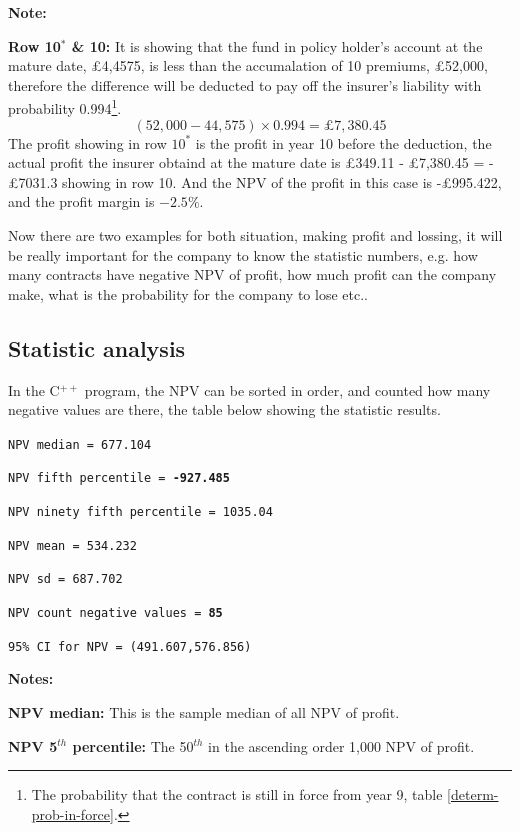 \documentclass{report}
\begin{document}
\textbf{Note:}


\textbf{Row 10$^*$ \& 10:} It is showing that the fund in policy holder's account at the mature date, \pounds 4,4575, is less than the accumalation of 10 premiums, \pounds 52,000, therefore the difference will be deducted to pay off the insurer's liability with probability 0.994\footnote{The probability that the contract is still in force from year 9, table \ref{determ-prob-in-force}.}. 
\[
(52,000- 44,575)\times 0.994= \pounds 7,380.45 
\]
The profit showing in row $10^*$ is the profit in year 10 before the deduction, the actual profit the insurer obtaind at the mature date is \pounds349.11 - \pounds7,380.45 = -\pounds 7031.3 showing in row 10. And the NPV of the profit in this case is -\pounds995.422, and the profit margin is $-2.5\%$.



Now there are two examples for both situation, making profit and lossing, it will be really important for the company to know the statistic numbers, e.g. how many contracts have negative NPV of profit, how much profit can the company make, what is the probability for the company to lose etc..

\subsection{Statistic analysis}

In the C$^{++}$ program, the NPV can be sorted in order, and counted how many negative values are there, the table below showing the statistic results. 

\texttt{NPV median = 677.104}

{\renewcommand\baselinestretch{1}\selectfont


\texttt{NPV fifth percentile = \textbf{-927.485}}

\texttt{NPV ninety fifth percentile = 1035.04}

\texttt{NPV mean = 534.232}

\texttt{NPV sd = 687.702}

\texttt{NPV count negative values = \textbf{85}}

\texttt{95\% CI for NPV = (491.607,576.856)}
\par}

\textbf{Notes:} 

\textbf{NPV median:} This is the sample median of all NPV of profit.

\textbf{NPV 5$^{th}$ percentile:} The 50$^{th}$ in the ascending order 1,000 NPV of profit.
\end{document}
